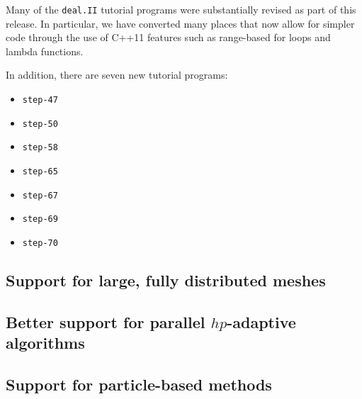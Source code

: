 \documentclass{ansarticle-preprint}
\newcommand{\specialword}[1]{\texttt{#1}}
\newcommand{\dealii}{{\specialword{deal.II}}\xspace}
\begin{document}
Many of the \dealii{} tutorial programs were substantially revised as
part of this release. In particular, we have converted many places
that now allow for simpler code through the use of C++11 features such
as range-based for loops and lambda functions.

In addition, there are seven new tutorial programs:
\begin{itemize}
\item \texttt{step-47}
\item \texttt{step-50}
\item \texttt{step-58}
\item \texttt{step-65}
\item \texttt{step-67}
\item \texttt{step-69}
\item \texttt{step-70}
\end{itemize}


\subsection{Support for large, fully distributed meshes}
\label{subsec:pfT}




\subsection{Better support for parallel $hp$-adaptive algorithms}
\label{subsec:hp}



\subsection{Support for particle-based methods}
\label{subsec:particles}
\end{document}
